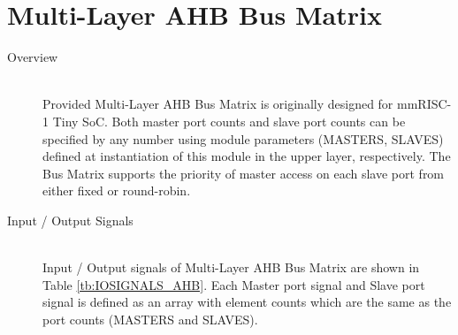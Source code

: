 \section{Multi-Layer AHB Bus Matrix}

\begin{description}

    \item[Overview]\mbox{}\\
        Provided Multi-Layer AHB Bus Matrix is originally designed for mmRISC-1 Tiny SoC. Both master port counts and slave port counts can be specified by any number using module parameters (MASTERS, SLAVES) defined at instantiation of this module in the upper layer, respectively. The Bus Matrix supports the priority of master access on each slave port from either fixed or round-robin. 
        
    \item[Input / Output Signals]\mbox{}\\
        Input / Output signals of Multi-Layer AHB Bus Matrix are shown in Table \ref{tb:IOSIGNALS_AHB}. Each Master port signal and Slave port signal is defined as an array with element counts which are the same as the port counts (MASTERS and SLAVES). 

\end{description}


